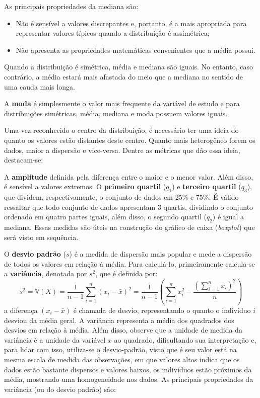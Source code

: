 \documentclass[
  12pt,
  letterpaper,
  DIV=11,
  numbers=noendperiod]{scrreprt}
\providecommand{\tightlist}{%
  \setlength{\itemsep}{0pt}\setlength{\parskip}{0pt}}\usepackage{longtable,booktabs,array}
\theoremstyle{definition}
\theoremstyle{exemplo}
\begin{document}
As principais propriedades da mediana são:

\begin{itemize}
\tightlist
\item
  Não é sensível a valores discrepantes e, portanto, é a mais apropriada
  para representar valores típicos quando a distribuição é assimétrica;
\item
  Não apresenta as propriedades matemáticas convenientes que a média
  possui.
\end{itemize}

Quando a distribuição é simétrica, média e mediana são iguais. No
entanto, caso contrário, a média estará mais afastada do meio que a
mediana no sentido de uma cauda mais longa.

A \textbf{moda} é simplesmente o valor mais frequente da variável de
estudo e para distribuições simétricas, média, mediana e moda possuem
valores iguais.

Uma vez reconhecido o centro da distribuição, é necessário ter uma ideia
do quanto os valores estão distantes deste centro. Quanto mais
heterogêneo forem os dados, maior a dispersão e vice-versa. Dentre as
métricas que dão essa ideia, destacam-se:

A \textbf{amplitude} definida pela diferença entre o maior e o menor
valor. Além disso, é sensível a valores extremos. O \textbf{primeiro
quartil} (\(q_1\)) e \textbf{terceiro quartil} (\(q_3\)), que dividem,
respectivamente, o conjunto de dados em 25\% e 75\%. É válido ressaltar
que todo conjunto de dados apresentam 3 quartis, dividindo o conjunto
ordenado em quatro partes iguais, além disso, o segundo quartil
(\(q_2\)) é igual a mediana. Essas medidas são úteis na construção do
gráfico de caixa (\emph{boxplot}) que será visto em sequência.

O \textbf{desvio padrão} (\(s\)) é a medida de dispersão mais popular e
mede a dispersão de todos os valores em relação à média. Para
calculá-lo, primeiramente calcula-se a \textbf{variância}, denotada por
\(s^2\), que é definida por:
\[s^2 = \mathbb{V}(X) = \frac{1}{n-1}\sum_{i = 1}^{n}(x_i - \bar{x})^2 = \frac{1}{n-1}\left(\sum_{i = 1}^{n}x_i^2 - \frac{\left(\sum_{i = 1}^{n} x_i\right)^2}{n}\right)\]
a diferença \((x_i - \bar{x})\) é chamada de desvio, representando o
quanto o indivíduo \(i\) desviou da média geral. A variância representa
a média dos quadrados dos desvios em relação à média. Além disso,
observe que a unidade de medida da variância é a unidade da variável
\(x\) ao quadrado, dificultando sua interpretação e, para lidar com
isso, utiliza-se o desvio-padrão, visto que é seu valor está na mesma
escala de medida das observações, em que valores altos indica que os
dados estão bastante dispersos e valores baixos, os indivíduos estão
próximos da média, mostrando uma homogeneidade nos dados. As principais
propriedades da variância (ou do desvio padrão) são:
\end{document}
